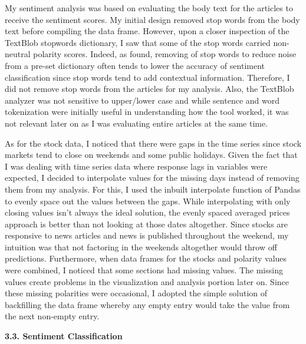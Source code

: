 \documentclass{acm_proc_article-sp}
\begin{document}
My sentiment analysis was based on evaluating the body text for the articles to receive the sentiment scores. My initial design removed stop words from the body text before compiling the data frame. However, upon a closer inspection of the TextBlob stopwords dictionary, I saw that some of the stop words carried non-neutral polarity scores.  Indeed, as \cite{saif_stopwords_2014} found, removing of stop words to reduce noise from a pre-set dictionary often tends to lower the accuracy of sentiment classification since stop words tend to add contextual information. Therefore, I did not remove stop words from the articles for my analysis. Also, the TextBlob analyzer was not sensitive to upper/lower case and while sentence and word tokenization were initially useful in understanding how the tool worked, it was not relevant later on as I was evaluating entire articles at the same time. 

As for the stock data, I noticed that there were gaps in the time series since stock markets tend to close on weekends and some public holidays. Given the fact that I was dealing with time series data where response lags in variables were expected, I decided to interpolate values for the missing days instead of removing them from my analysis. For this, I used the inbuilt interpolate function of Pandas to evenly space out the values between the gaps. While interpolating with only closing values isn't always the ideal solution, the evenly spaced averaged prices approach is better than not looking at those dates altogether. Since stocks are responsive to news articles and news is published throughout the weekend, my intuition was that not factoring in the weekends altogether would throw off predictions. Furthermore, when data frames for the stocks and polarity values were combined, I noticed that some sections had missing values. The missing values create problems in the visualization and analysis portion later on. Since these missing polarities were occasional, I adopted the simple solution of backfilling the data frame whereby any empty entry would take the value from the next non-empty entry. 


\textbf{3.3. Sentiment Classification}
\end{document}
